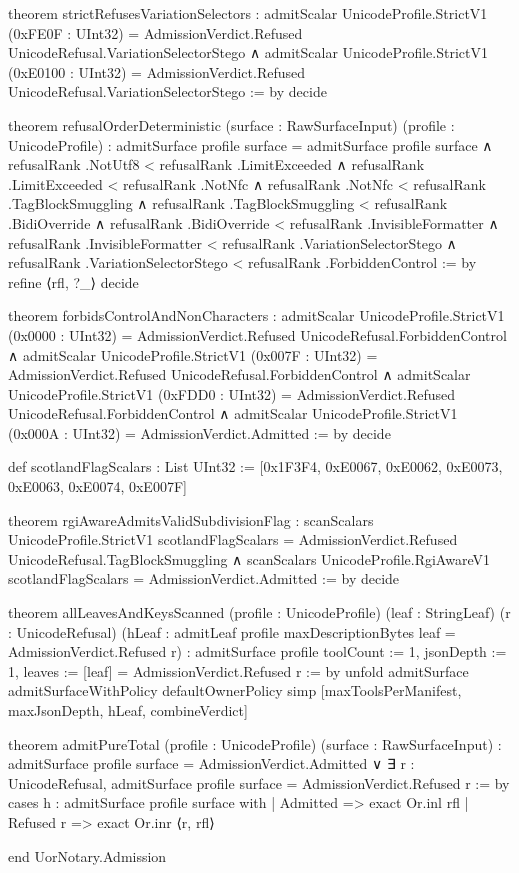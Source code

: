 \documentclass[12pt]{lexlean}
\begin{document}
\begin{lean}
theorem strictRefusesVariationSelectors :
    admitScalar UnicodeProfile.StrictV1 (0xFE0F : UInt32) = AdmissionVerdict.Refused UnicodeRefusal.VariationSelectorStego ∧
    admitScalar UnicodeProfile.StrictV1 (0xE0100 : UInt32) = AdmissionVerdict.Refused UnicodeRefusal.VariationSelectorStego := by
  decide

theorem refusalOrderDeterministic (surface : RawSurfaceInput) (profile : UnicodeProfile) :
    admitSurface profile surface = admitSurface profile surface ∧
    refusalRank .NotUtf8 < refusalRank .LimitExceeded ∧
    refusalRank .LimitExceeded < refusalRank .NotNfc ∧
    refusalRank .NotNfc < refusalRank .TagBlockSmuggling ∧
    refusalRank .TagBlockSmuggling < refusalRank .BidiOverride ∧
    refusalRank .BidiOverride < refusalRank .InvisibleFormatter ∧
    refusalRank .InvisibleFormatter < refusalRank .VariationSelectorStego ∧
    refusalRank .VariationSelectorStego < refusalRank .ForbiddenControl := by
  refine ⟨rfl, ?_⟩
  decide

theorem forbidsControlAndNonCharacters :
    admitScalar UnicodeProfile.StrictV1 (0x0000 : UInt32) = AdmissionVerdict.Refused UnicodeRefusal.ForbiddenControl ∧
    admitScalar UnicodeProfile.StrictV1 (0x007F : UInt32) = AdmissionVerdict.Refused UnicodeRefusal.ForbiddenControl ∧
    admitScalar UnicodeProfile.StrictV1 (0xFDD0 : UInt32) = AdmissionVerdict.Refused UnicodeRefusal.ForbiddenControl ∧
    admitScalar UnicodeProfile.StrictV1 (0x000A : UInt32) = AdmissionVerdict.Admitted := by
  decide

def scotlandFlagScalars : List UInt32 :=
  [0x1F3F4, 0xE0067, 0xE0062, 0xE0073, 0xE0063, 0xE0074, 0xE007F]

theorem rgiAwareAdmitsValidSubdivisionFlag :
    scanScalars UnicodeProfile.StrictV1 scotlandFlagScalars = AdmissionVerdict.Refused UnicodeRefusal.TagBlockSmuggling ∧
    scanScalars UnicodeProfile.RgiAwareV1 scotlandFlagScalars = AdmissionVerdict.Admitted := by
  decide

theorem allLeavesAndKeysScanned (profile : UnicodeProfile) (leaf : StringLeaf) (r : UnicodeRefusal)
    (hLeaf : admitLeaf profile maxDescriptionBytes leaf = AdmissionVerdict.Refused r) :
    admitSurface profile { toolCount := 1, jsonDepth := 1, leaves := [leaf] } =
      AdmissionVerdict.Refused r := by
  unfold admitSurface admitSurfaceWithPolicy defaultOwnerPolicy
  simp [maxToolsPerManifest, maxJsonDepth, hLeaf, combineVerdict]

theorem admitPureTotal (profile : UnicodeProfile) (surface : RawSurfaceInput) :
    admitSurface profile surface = AdmissionVerdict.Admitted ∨
    ∃ r : UnicodeRefusal, admitSurface profile surface = AdmissionVerdict.Refused r := by
  cases h : admitSurface profile surface with
  | Admitted  => exact Or.inl rfl
  | Refused r => exact Or.inr ⟨r, rfl⟩

end UorNotary.Admission
\end{lean}
\end{document}

